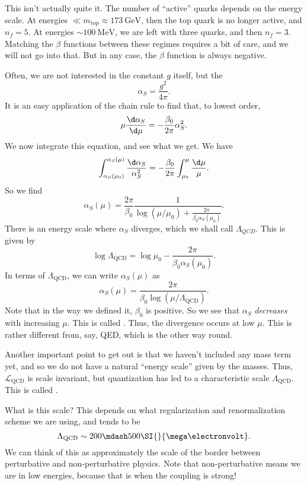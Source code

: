 \documentclass[a4paper]{article}
\begin{document}
This isn't actually quite it. The number of ``active'' quarks depends on the energy scale. At energies $\ll m_{\mathrm{top}} \approx \SI{173}{\giga\electronvolt}$, then the top quark is no longer active, and $n_f = 5$. At energies $\sim \SI{100}{\mega\electronvolt}$, we are left with three quarks, and then $n_f = 3$. Matching the $\beta$ functions between these regimes requires a bit of care, and we will not go into that. But in any case, the $\beta$ function is always negative.

Often, we are not interested in the constant $g$ itself, but the 
\[
  \alpha_S = \frac{g^2}{4\pi}.
\]
It is an easy application of the chain rule to find that, to lowest order,
\[
  \mu \frac{\d \alpha_S}{\d \mu} = - \frac{\beta_0}{2\pi} \alpha_S^2.
\]
We now integrate this equation, and see what we get. We have
\[
  \int_{\alpha_S(\mu_0)}^{\alpha_S(\mu)} \frac{\d \alpha_S}{\alpha_S^2} = - \frac{\beta_0}{2\pi} \int_{\mu_0}^\mu \frac{\d \mu}{\mu}.
\]
So we find
\[
  \alpha_S(\mu) = \frac{2\pi}{\beta_0} \frac{1}{\log (\mu/\mu_0) + \frac{2\pi}{\beta_0 \alpha_S(\mu_0)}}.
\]
There is an energy scale where $\alpha_S$ diverges, which we shall call $\Lambda_{QCD}$. This is given by
\[
  \log \Lambda_{\mathrm{QCD}} = \log \mu_0 - \frac{2\pi}{\beta_0 \alpha_S(\mu_0)}.
\]
In terms of $\Lambda_{\mathrm{QCD}}$, we can write $\alpha_S(\mu)$ as
\[
  \alpha_S(\mu) = \frac{2\pi}{\beta_0 \log (\mu/\Lambda_{\mathrm{QCD}})}.
\]
Note that in the way we defined it, $\beta_0$ is positive. So we see that $\alpha_S$ \emph{decreases} with increasing $\mu$. This is called . Thus, the divergence occurs at low $\mu$. This is rather different from, say, QED, which is the other way round.

Another important point to get out is that we haven't included any mass term yet, and so we do not have a natural ``energy scale'' given by the masses. Thus, $\mathcal{L}_{\mathrm{QCD}}$ is scale invariant, but quantization has led to a characteristic scale $\Lambda_{\mathrm{QCD}}$. This is called .

What is this scale? This depends on what regularization and renormalization scheme we are using, and tends to be
\[
  \Lambda_{\mathrm{QCD}} \sim 200\mdash 500\SI{}{\mega\electronvolt}.
\]
We can think of this as approximately the scale of the border between perturbative and non-perturbative physics. Note that non-perturbative means we are in low energies, because that is when the coupling is strong!
\end{document}
